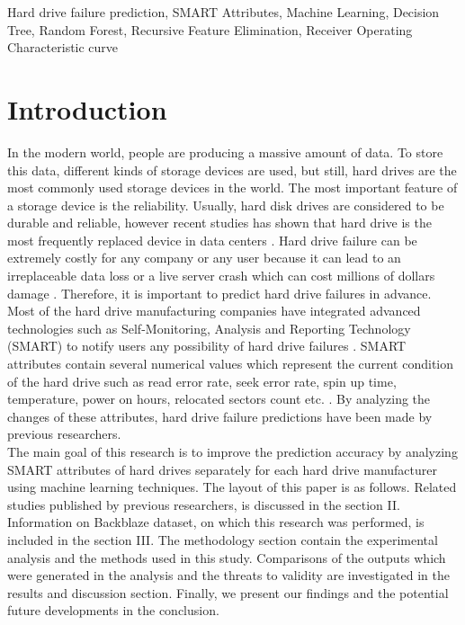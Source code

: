 \documentclass[conference]{IEEEtran}
\begin{document}
\begin{IEEEkeywords}
Hard drive failure prediction, SMART Attributes, Machine Learning, Decision Tree, Random Forest, Recursive Feature Elimination, Receiver Operating Characteristic curve
\end{IEEEkeywords}

\section{Introduction}
In the modern world, people are producing a massive amount of data. To store this data, different kinds of storage devices are used, but still, hard drives are the most commonly used storage devices in the world. The most important feature of a storage device is the reliability. Usually, hard disk drives are considered to be durable and reliable, however recent studies has shown that hard drive is the most frequently replaced device in data centers \cite{b1}. 
Hard drive failure can be extremely costly for any company or any user because it can lead to an irreplaceable data loss or a live server crash which can cost millions of dollars damage \cite{b2}. Therefore, it is important to predict hard drive failures in advance. Most of the hard drive manufacturing companies have integrated advanced technologies such as Self-Monitoring, Analysis and Reporting Technology (SMART) to notify users any possibility of hard drive failures \cite{b3}. SMART attributes contain several numerical values which represent the current condition of the hard drive such as read error rate, seek error rate, spin up time, temperature, power on hours, relocated sectors count etc. \cite{b4,b5}. By analyzing the changes of these attributes, hard drive failure predictions have been made by previous researchers.\\ 


The main goal of this research is to improve the prediction accuracy by analyzing SMART attributes of hard drives separately for each hard drive manufacturer using machine learning techniques. The layout of this paper is as follows. Related studies published by previous researchers, is discussed in the section II. Information on Backblaze dataset, on which this research was performed, is included in the section III. The methodology section contain the experimental analysis and the methods used in this study. Comparisons of the outputs which were generated in the analysis and the threats to validity are investigated in the results and discussion section. Finally, we present our findings and the potential future developments in the conclusion.
\end{document}
